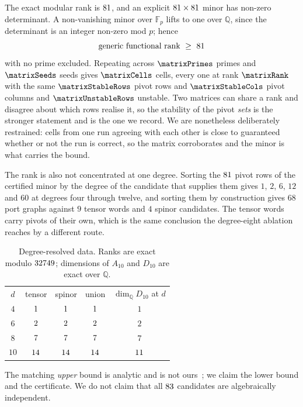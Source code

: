 \documentclass[
  aps,prd,
  reprint,
  letterpaper,
  amsmath,amssymb,
  nofootinbib,
  superscriptaddress
]{revtex4-2}
\theoremstyle{plain}
\newcommand{\Ften}{A_{10}}
\newcommand{\Dten}{D_{10}}
\newcommand{\Fp}{\mathbb{F}_p}
\newcommand{\Q}{\mathbb{Q}}
\begin{document}
The exact modular rank is $81$, and an explicit
$81\times81$ minor has non-zero determinant. A non-vanishing
minor over $\Fp$ lifts to one over $\Q$, since the determinant is an integer
non-zero mod $p$; hence
\begin{equation}
\text{generic functional rank}\ \ge\ \charZeroLowerBound
\end{equation}
with no prime excluded. Repeating across $\matrixPrimes$ primes and
$\matrixSeeds$ seeds gives $\matrixCells$ cells, every one at rank
$\matrixRank$ with the same $\matrixStableRows$ pivot rows and
$\matrixStableCols$ pivot columns and $\matrixUnstableRows$ unstable. Two
matrices can share a rank and disagree about which rows realise it, so the
stability of the pivot \emph{sets} is the stronger statement and is the one we
record. We are nonetheless deliberately restrained: cells from one run agreeing
with each other is close to guaranteed whether or not the run is correct, so the
matrix corroborates and the minor is what carries the bound.

The rank is also not concentrated at one degree. Sorting the $81$ pivot
rows of the certified minor by the degree of the candidate that supplies them
gives $1$, $2$, $6$, $12$ and $60$ at degrees four through twelve, and sorting
them by construction gives $68$ port graphs against $9$ tensor words and $4$
spinor candidates. The tensor words carry pivots of their own, which is the same
conclusion the degree-eight ablation reaches by a different route.

\begin{table}[t]
\caption{Degree-resolved data. Ranks are exact modulo
$32749$; dimensions of $\Ften$ and $\Dten$ are exact over $\Q$.}
\label{tab:degrees}
\begin{ruledtabular}
\begin{tabular}{ccccc}
$d$ & tensor & spinor & union & $\dim_\Q\Dten$ at $d$ \\
\colrule
$4$  & $1$  & $1$  & $1$  & $1$ \\
$6$  & $2$   & $2$   & $2$   & $2$ \\
$8$  & $7$   & $7$   & $7$   & $7$ \\
$10$ & $14$   & $14$   & $14$   & $11$ \\
\end{tabular}
\end{ruledtabular}
\end{table} The matching \emph{upper} bound is analytic and is not
ours~\cite{Hutomo:2025chiral}; we claim the lower bound and the certificate. We
do not claim that all $83$ candidates are algebraically
independent.
\end{document}
